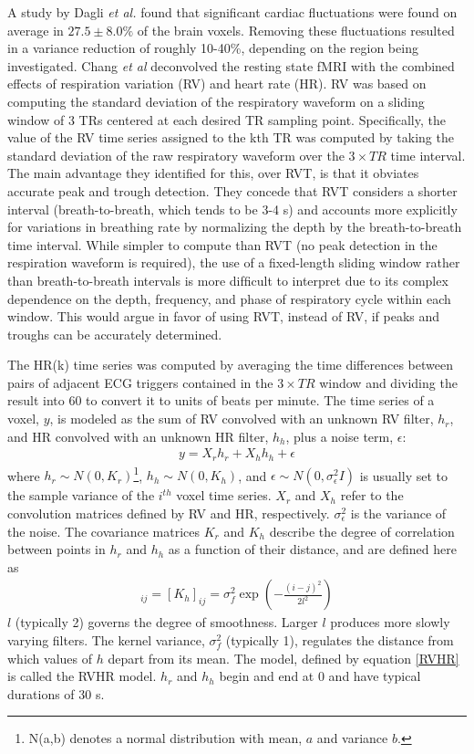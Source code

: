 \documentclass[twoside,twocolumn]{article}
\begin{document}
A study by Dagli {\em et al.}\cite{Dagli1999} found that signiﬁcant cardiac ﬂuctuations were found on average in $27.5 \pm 8.0\%$ of the brain voxels. Removing these ﬂuctuations resulted in a variance reduction of roughly 10-40\%, depending on the region being investigated.  Chang {\em et al}\cite{Chang2009b} deconvolved the resting state fMRI with the combined effects of respiration variation (RV) and heart rate (HR). RV was based on computing the standard deviation of the respiratory waveform on a sliding window of 3 TRs centered at each desired TR sampling point. Speciﬁcally, the value of the RV time series assigned to the kth TR was computed by taking the standard deviation of the raw respiratory waveform over the $3 \times TR$ time interval.  The main advantage they identified for this, over RVT, is that it obviates accurate peak and trough detection.  They concede that RVT considers a shorter interval (breath-to-breath, which tends to be 3-4 s) and accounts more explicitly for variations in breathing rate by normalizing the depth by the breath-to-breath time interval. While simpler to compute than RVT (no peak detection in the respiration waveform is required), the use of a ﬁxed-length sliding window rather than breath-to-breath intervals is more difﬁcult to interpret due to its complex dependence on the depth, frequency, and phase of respiratory cycle within each window.   This would argue in favor of using RVT, instead of RV, if peaks and troughs can be accurately determined.

The HR(k) time series was computed by averaging the time differences between pairs of adjacent ECG triggers contained in the $3 \times TR$ window and dividing the result into 60 to convert it to units of beats per minute.  The time series of a voxel, $y$, is modeled as the sum of RV convolved with an unknown RV ﬁlter, $h_r$, and HR convolved with an unknown HR ﬁlter, $h_h$, plus a noise term, $\epsilon$:
\begin{eqnarray}
	y = X_rh_r + X_hh_h + \epsilon
	\label{RVHR}
\end{eqnarray}
where $h_r \sim N(0,K_r)$\footnote{N(a,b) denotes a normal distribution with mean, $a$ and variance $b$.}, $h_h \sim N(0,K_h)$, and $\epsilon \sim N(0,\sigma_{\epsilon}^{2}I)$ is usually set to the sample variance of the $i^{th}$ voxel time series. $X_r$ and $X_h$ refer to the convolution matrices deﬁned by RV and HR, respectively.  $\sigma_{\epsilon}^2$ is the variance of the noise.  The covariance matrices $K_r$ and $K_h$ describe the degree of correlation between points in $h_r$ and $h_h$ as a function of their distance, and are deﬁned here as
\begin{eqnarray}
	[K_r]_{ij}=[K_h]_{ij}=\sigma_f^2\exp\left(-\frac{(i-j)^2}{2l^2}\right)
\end{eqnarray}
$l$ (typically 2) governs the degree of smoothness.   Larger $l$ produces more slowly varying filters.  The kernel variance, $\sigma_f^2$ (typically 1), regulates the distance from which values of $h$ depart from its mean.  The model, defined by equation \ref{RVHR} is called the RVHR model.  $h_r$ and $h_h$ begin and end at 0 and have typical durations of 30 s.
\end{document}
